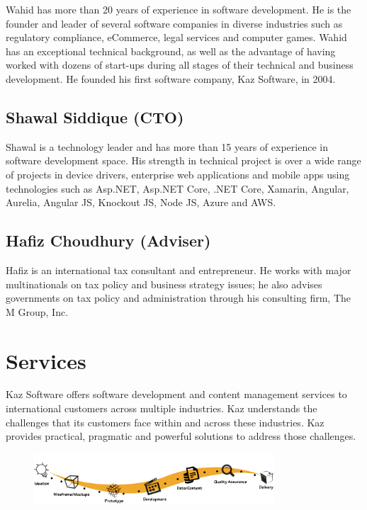 Wahid has more than 20 years of experience in software development.
He is the founder and leader of several software companies in diverse industries such as regulatory compliance, eCommerce, legal services and computer games. 
Wahid has an exceptional technical background, as well as the advantage of having worked with dozens of start-ups during all stages of their technical and business development. He founded his first software company, Kaz Software, in 2004.

\subsection[CTO]{Shawal Siddique (CTO)}

Shawal is a technology leader and has more than 15 years of experience in software development space.
His strength in technical project is over a wide range of projects in device drivers, enterprise web applications and mobile apps using technologies such as Asp.NET, Asp.NET Core, .NET Core, Xamarin, Angular, Aurelia, Angular JS, Knockout JS, Node JS, Azure and AWS.

\subsection[Adviser]{Hafiz Choudhury (Adviser)}

Hafiz is an international tax consultant and entrepreneur.
He works with major multinationals on tax policy and business strategy issues; he also advises governments on tax policy and administration through his consulting firm, The M Group, Inc.

\section{Services}

Kaz Software offers software development and content management services to international customers across multiple industries.
Kaz understands the challenges that its customers face within and across these industries.
Kaz provides practical, pragmatic and powerful solutions to address those challenges.

\begin{figure}[h]
    \begin{center}
        \includegraphics[width= 0.8\textwidth]{images/Chapter2/kaz_services.png}  
        \label{fig:kazServices}
    \end{center}
\end{figure}

